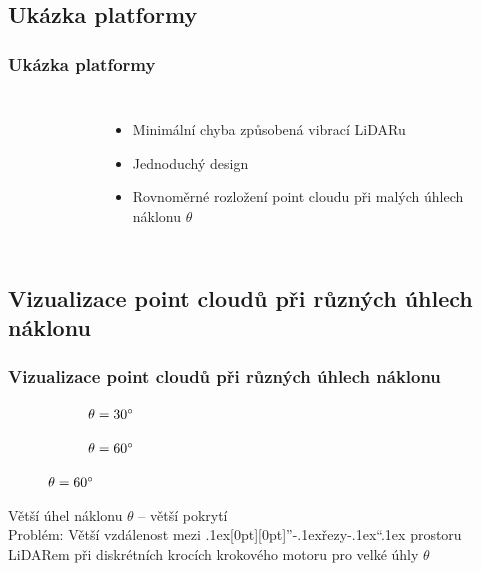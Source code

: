 \documentclass[169]{beamer}
\def\bq{\mbox{\kern.1ex\protect\raisebox{-1.3ex}[0pt][0pt]{''}\kern-.1ex}}
\def\eq{\mbox{\kern-.1ex``\kern.1ex}}
\gdef\uv#1{\bq #1\eq}
\begin{document}
\subsection{Ukázka platformy}
\begin{frame}
\frametitle{Ukázka platformy}
\begin{columns}
\begin{figure}[H]
    
    \label{fig:tikz_platform}
\end{figure}
\begin{itemize}
    \item Minimální chyba způsobená vibrací LiDARu
    \item Jednoduchý design
    \item Rovnoměrné rozložení point cloudu při malých úhlech náklonu $\theta$
\end{itemize}
\end{columns}
\end{frame}



\subsection{Vizualizace point cloudů při různých úhlech náklonu}
\begin{frame}
\frametitle{Vizualizace point cloudů při různých úhlech náklonu}
\begin{figure}[h!]
    \centering
    
    \begin{subfigure}{0.45\linewidth}
        \centering
        
        \caption{$\theta=30\degree$}
        \label{fig:rotate_pointCloud:30}
    \end{subfigure}
    \hfill
    \begin{subfigure}{0.45\linewidth}
        \centering
        
        \caption{$\theta=60\degree$}
        \label{fig:rotate_pointCloud:60}
    \end{subfigure}
    \label{fig:rotate_pointCloud}
\end{figure}
\begin{minipage}{10cm}
Větší úhel náklonu $\theta$ -- větší pokrytí \\\pause
{\color{red} Problém:} Větší vzdálenost mezi \uv{řezy} prostoru LiDARem při diskrétních krocích krokového motoru pro velké úhly $\theta$
\end{minipage}
\end{frame}
\end{document}
